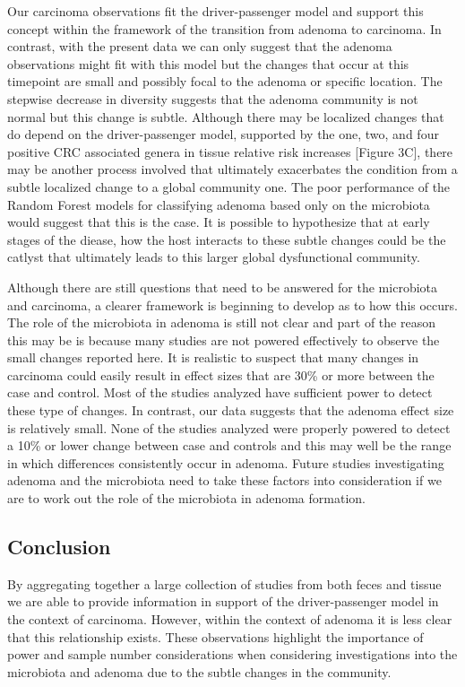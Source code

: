\documentclass[12pt,]{article}
\begin{document}
Our carcinoma observations fit the driver-passenger model and support
this concept within the framework of the transition from adenoma to
carcinoma. In contrast, with the present data we can only suggest that
the adenoma observations might fit with this model but the changes that
occur at this timepoint are small and possibly focal to the adenoma or
specific location. The stepwise decrease in diversity suggests that the
adenoma community is not normal but this change is subtle. Although
there may be localized changes that do depend on the driver-passenger
model, supported by the one, two, and four positive CRC associated
genera in tissue relative risk increases {[}Figure 3C{]}, there may be
another process involved that ultimately exacerbates the condition from
a subtle localized change to a global community one. The poor
performance of the Random Forest models for classifying adenoma based
only on the microbiota would suggest that this is the case. It is
possible to hypothesize that at early stages of the diease, how the host
interacts to these subtle changes could be the catlyst that ultimately
leads to this larger global dysfunctional community.

Although there are still questions that need to be answered for the
microbiota and carcinoma, a clearer framework is beginning to develop as
to how this occurs. The role of the microbiota in adenoma is still not
clear and part of the reason this may be is because many studies are not
powered effectively to observe the small changes reported here. It is
realistic to suspect that many changes in carcinoma could easily result
in effect sizes that are 30\% or more between the case and control. Most
of the studies analyzed have sufficient power to detect these type of
changes. In contrast, our data suggests that the adenoma effect size is
relatively small. None of the studies analyzed were properly powered to
detect a 10\% or lower change between case and controls and this may
well be the range in which differences consistently occur in adenoma.
Future studies investigating adenoma and the microbiota need to take
these factors into consideration if we are to work out the role of the
microbiota in adenoma formation.

\subsection{Conclusion}\label{conclusion}

By aggregating together a large collection of studies from both feces
and tissue we are able to provide information in support of the
driver-passenger model in the context of carcinoma. However, within the
context of adenoma it is less clear that this relationship exists. These
observations highlight the importance of power and sample number
considerations when considering investigations into the microbiota and
adenoma due to the subtle changes in the community.
\end{document}
